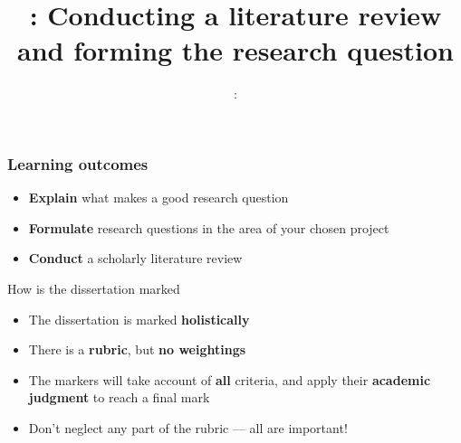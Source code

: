 \usepackage{../../beamerthemeFalmouthGamesAcademy}
\usepackage{multimedia}
\graphicspath{ {../../} }


\usepackage[normalem]{ulem}
\usepackage{wasysym}

\usepackage{algpseudocode}

\usepackage{pdfpages}

\usepackage{fancyvrb}

\usetikzlibrary{arrows,automata}


\title{\sessionnumber: Conducting a literature review and forming the research question}
\subtitle{\modulecode: \moduletitle}

\frame{\titlepage} 

\begin{frame}
	\frametitle{Learning outcomes}
	\begin{itemize}
		\item \textbf{Explain} what makes a good research question
		\item \textbf{Formulate} research questions in the area of your chosen project
		\item \textbf{Conduct} a scholarly literature review
	\end{itemize}
\end{frame}

\begin{frame}{How is the dissertation marked}
	\begin{itemize}
		\pause\item The dissertation is marked \textbf{holistically}
		\pause\item There is a \textbf{rubric}, but \textbf{no weightings}
		\pause\item The markers will take account of \textbf{all} criteria,
		    and apply their \textbf{academic judgment} to reach a final mark
		\pause\item Don't neglect any part of the rubric --- all are important!
	\end{itemize}
\end{frame}








